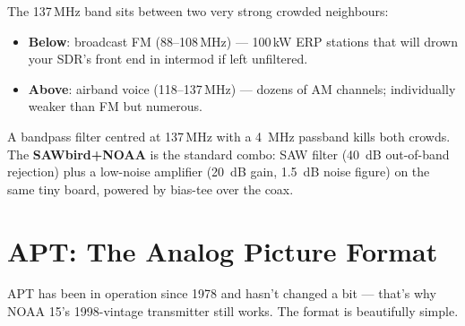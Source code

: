 \documentclass[11pt,a4paper]{article}
\begin{document}
The 137\,MHz band sits between two very strong crowded neighbours:

\begin{itemize}
  \item \textbf{Below}: broadcast FM (88--108\,MHz) — 100\,kW ERP
        stations that will drown your SDR's front end in intermod if
        left unfiltered.
  \item \textbf{Above}: airband voice (118--137\,MHz) — dozens of
        AM channels; individually weaker than FM but numerous.
\end{itemize}

A bandpass filter centred at 137\,MHz with a \SI{4}{MHz} passband
kills both crowds.  The \textbf{SAWbird+NOAA} is the standard
combo: SAW filter (\SI{40}{dB} out-of-band rejection) plus a
low-noise amplifier (\SI{20}{dB} gain, \SI{1.5}{dB} noise figure) on
the same tiny board, powered by bias-tee over the coax.

\begin{center}
\end{center}

\section{APT: The Analog Picture Format}

APT has been in operation since 1978 and hasn't changed a bit —
that's why NOAA 15's 1998-vintage transmitter still works.  The
format is beautifully simple.
\end{document}
